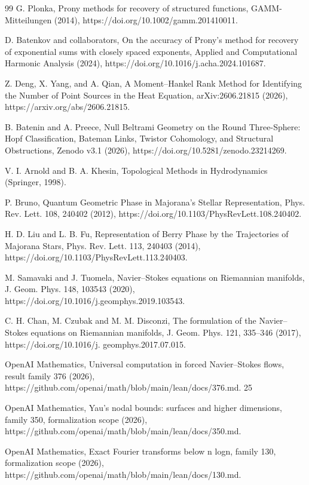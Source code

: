 \documentclass[10pt,letterpaper]{article}
\theoremstyle{remark}
\begin{document}
\begin{thebibliography}{99}
 G. Plonka, Prony methods for recovery of structured functions, GAMM-Mitteilungen (2014), https://doi.org/10.1002/gamm.201410011.

 D. Batenkov and collaborators, On the accuracy of Prony’s method for recovery of exponential sums with closely spaced exponents, Applied and Computational Harmonic Analysis (2024), https://doi.org/10.1016/j.acha.2024.101687.

 Z. Deng, X. Yang, and A. Qian, A Moment–Hankel Rank Method for Identifying the Number of Point Sources in the Heat Equation, arXiv:2606.21815 (2026), https://arxiv.org/abs/2606.21815.

 B. Batenin and A. Preece, Null Beltrami Geometry on the Round Three-Sphere: Hopf Classification, Bateman Links, Twistor Cohomology, and Structural Obstructions, Zenodo v3.1 (2026), https://doi.org/10.5281/zenodo.23214269.

 V. I. Arnold and B. A. Khesin, Topological Methods in Hydrodynamics (Springer, 1998).

 P. Bruno, Quantum Geometric Phase in Majorana’s Stellar Representation, Phys. Rev. Lett. 108, 240402 (2012), https://doi.org/10.1103/PhysRevLett.108.240402.

 H. D. Liu and L. B. Fu, Representation of Berry Phase by the Trajectories of Majorana Stars, Phys. Rev. Lett. 113, 240403 (2014), https://doi.org/10.1103/PhysRevLett.113.240403.

 M. Samavaki and J. Tuomela, Navier–Stokes equations on Riemannian manifolds, J. Geom. Phys. 148, 103543 (2020), https://doi.org/10.1016/j.geomphys.2019.103543.

 C. H. Chan, M. Czubak and M. M. Disconzi, The formulation of the Navier–Stokes equations on Riemannian manifolds, J. Geom. Phys. 121, 335–346 (2017), https://doi.org/10.1016/j. geomphys.2017.07.015.

 OpenAI Mathematics, Universal computation in forced Navier–Stokes flows, result family 376 (2026), https://github.com/openai/math/blob/main/lean/docs/376.md. 25

 OpenAI Mathematics, Yau’s nodal bounds: surfaces and higher dimensions, family 350, formalization scope (2026), https://github.com/openai/math/blob/main/lean/docs/350.md.

 OpenAI Mathematics, Exact Fourier transforms below n logn, family 130, formalization scope (2026), https://github.com/openai/math/blob/main/lean/docs/130.md.


\end{thebibliography}
\end{document}

